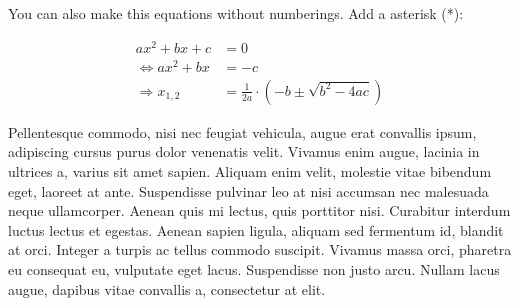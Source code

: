 \documentclass[11pt,a4paper,oneside]{report}
\begin{document}
You can also make this equations without numberings. Add a asterisk (*):

\begin{align*}
                    ax^2+bx+c &= 0\\
    \Leftrightarrow ax^2+bx   &= -c\\
    \Rightarrow x_{1,2} &= \frac{1}{2a} \cdot (-b \pm \sqrt{b^2 - 4ac})
\end{align*}

Pellentesque commodo, nisi nec feugiat vehicula, augue erat convallis ipsum, adipiscing cursus purus dolor venenatis velit. Vivamus enim augue, lacinia in ultrices a, varius sit amet sapien. Aliquam enim velit, molestie vitae bibendum eget, laoreet at ante. Suspendisse pulvinar leo at nisi accumsan nec malesuada neque ullamcorper. Aenean quis mi lectus, quis porttitor nisi. Curabitur interdum luctus lectus et egestas. Aenean sapien ligula, aliquam sed fermentum id, blandit at orci. Integer a turpis ac tellus commodo suscipit. Vivamus massa orci, pharetra eu consequat eu, vulputate eget lacus. Suspendisse non justo arcu. Nullam lacus augue, dapibus vitae convallis a, consectetur at elit.
\end{document}
